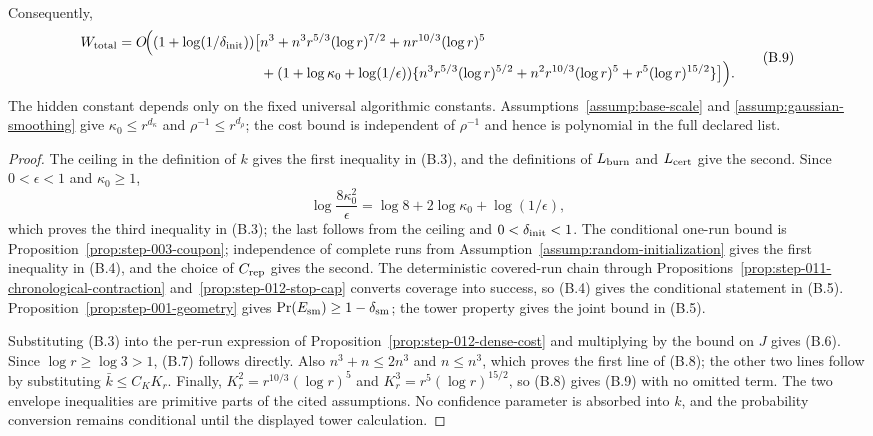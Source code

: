 \begin{proposition}
\[\begin{aligned}
\end{aligned}
\tag{B.8}
\]
Consequently,
\[
\begin{aligned}
W_{\rm total}=O\!\Big((1+\log(1/\delta_{\rm init}))\big[&n^3
+n^3r^{5/3}(\log r)^{7/2}+nr^{10/3}(\log r)^5\\
&+(1+\log\kappa _0+\log(1/\epsilon))
\{n^3r^{5/3}(\log r)^{5/2}
+n^2r^{10/3}(\log r)^5+r^5(\log r)^{15/2}\}\big]\Big).
\end{aligned}
\tag{B.9}
\]
The hidden constant depends only on the fixed universal algorithmic constants.
Assumptions~\ref{assump:base-scale} and
\ref{assump:gaussian-smoothing} give
$\kappa _0\le r^{d_\kappa}$ and $\rho^{-1}\le r^{d_\rho}$; the cost bound is
independent of $\rho^{-1}$ and hence is polynomial in the full declared list.
\end{proposition}

\begin{proof}
The ceiling in the definition of $k$ gives the first inequality in (B.3),
and the definitions of $L_{\rm burn}$ and $L_{\rm cert}$ give the second. Since
$0<\epsilon<1$ and $\kappa _0\ge1$,
\[
\log\frac{8\kappa _0^2}{\epsilon}
 =\log 8+2\log\kappa _0+\log(1/\epsilon),
\]
which proves the third inequality in (B.3); the last follows from the ceiling
and $0<\delta_{\rm init}<1$.  The conditional one-run bound is
Proposition~\ref{prop:step-003-coupon}; independence of complete runs from
Assumption~\ref{assump:random-initialization} gives the first inequality in
(B.4), and the choice of $C_{\rm rep}$ gives the second. The deterministic
covered-run chain through Propositions~\ref{prop:step-011-chronological-contraction}
and~\ref{prop:step-012-stop-cap} converts coverage into success, so (B.4)
gives the conditional statement in (B.5). Proposition~\ref{prop:step-001-geometry}
gives $\Pr(E_{\rm sm})\ge1-\delta_{\rm sm}$; the tower property gives the
joint bound in (B.5).

Substituting (B.3) into the per-run expression of
Proposition~\ref{prop:step-012-dense-cost} and multiplying by the bound on
$J$ gives (B.6). Since $\log r\ge\log3>1$, (B.7) follows directly. Also
$n^3+n\le2n^3$ and $n\le n^3$, which proves the first line of (B.8); the
other two lines follow by substituting $\bar k\le C_KK_r$. Finally,
$K_r^2=r^{10/3}(\log r)^5$ and
$K_r^3=r^5(\log r)^{15/2}$, so (B.8) gives (B.9) with no omitted term.
The two envelope inequalities are primitive parts of the cited assumptions.
No confidence parameter is absorbed into $k$, and the probability conversion
remains conditional until the displayed tower calculation.
\end{proof}

